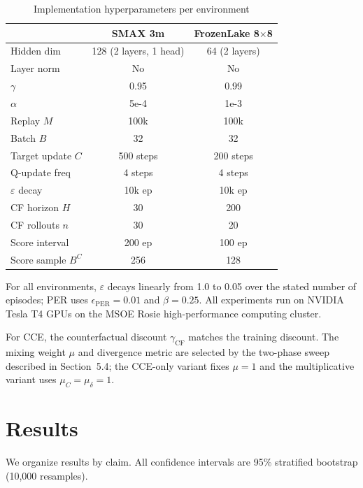 \documentclass[conference]{IEEEtran}
\begin{document}
\begin{table}[htbp]
\caption{Implementation hyperparameters per environment}
\label{tab:impl}
\begin{center}
\begin{tabular}{|l|c|c|}
\hline
 & \textbf{SMAX 3m} & \textbf{FrozenLake 8$\times$8} \\
\hline
Hidden dim      & 128 (2 layers, 1 head) & 64 (2 layers) \\
Layer norm      & No    & No   \\
$\gamma$        & 0.95  & 0.99 \\
$\alpha$        & 5e-4  & 1e-3 \\
Replay $M$      & 100k  & 100k \\
Batch $B$       & 32    & 32   \\
Target update $C$ & 500 steps & 200 steps \\
Q-update freq   & 4 steps & 4 steps \\
$\varepsilon$ decay & 10k ep & 10k ep \\
CF horizon $H$  & 30    & 200  \\
CF rollouts $n$ & 30    & 20   \\
Score interval  & 200 ep & 100 ep \\
Score sample $B^C$ & 256 & 128 \\
\hline
\end{tabular}
\end{center}
\end{table}

\noindent For all environments, $\varepsilon$ decays linearly from 1.0 to 0.05 over the stated number of episodes; PER uses $\epsilon_{\text{PER}} = 0.01$ and $\beta = 0.25$. All experiments run on NVIDIA Tesla T4 GPUs on the MSOE Rosie high-performance computing cluster.

For CCE, the counterfactual discount $\gamma_{\text{CF}}$ matches the training discount. The mixing weight $\mu$ and divergence metric are selected by the two-phase sweep described in Section~5.4; the CCE-only variant fixes $\mu = 1$ and the multiplicative variant uses $\mu_C = \mu_\delta = 1$.

\section{Results}

We organize results by claim.
All confidence intervals are 95\% stratified bootstrap (10{,}000 resamples).
\end{document}
